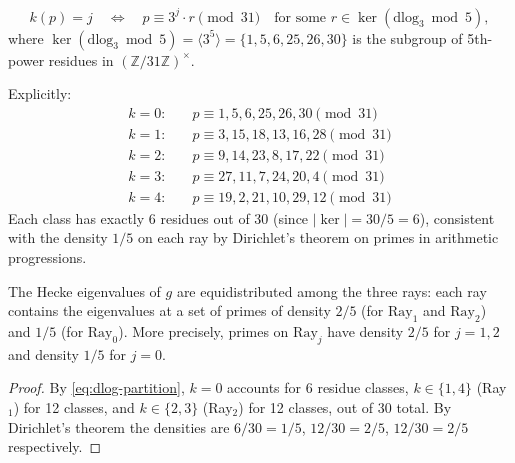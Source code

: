 \begin{equation}
\label{eq:dlog-partition}
  k(p) = j \quad\Longleftrightarrow\quad
  p \equiv 3^j \cdot r \pmod{31}
  \quad \text{for some } r \in \ker(\mathrm{dlog}_3 \bmod 5),
\end{equation}
where $\ker(\mathrm{dlog}_3 \bmod 5) = \langle 3^5 \rangle = \{1, 5, 6, 25, 26, 30\}$
is the subgroup of 5th-power residues in $(\mathbb{Z}/31\mathbb{Z})^\times$.

Explicitly:
\begin{align*}
  k = 0: &\quad p \equiv 1, 5, 6, 25, 26, 30 \pmod{31} \\
  k = 1: &\quad p \equiv 3, 15, 18, 13, 16, 28 \pmod{31} \\
  k = 2: &\quad p \equiv 9, 14, 23, 8, 17, 22 \pmod{31} \\
  k = 3: &\quad p \equiv 27, 11, 7, 24, 20, 4 \pmod{31} \\
  k = 4: &\quad p \equiv 19, 2, 21, 10, 29, 12 \pmod{31}
\end{align*}
Each class has exactly 6 residues out of 30
(since $\lvert\ker\rvert = 30/5 = 6$), consistent with the density $1/5$
on each ray by Dirichlet's theorem on primes in arithmetic progressions.

\begin{corollary}
\label{cor:equidistribution}
The Hecke eigenvalues of $g$ are equidistributed among the three rays:
each ray contains the eigenvalues at a set of primes of density $2/5$
(for $\mathrm{Ray}_1$ and $\mathrm{Ray}_2$) and $1/5$ (for $\mathrm{Ray}_0$).
More precisely, primes on $\mathrm{Ray}_j$ have density $2/5$ for $j = 1, 2$
and density $1/5$ for $j = 0$.
\end{corollary}

\begin{proof}
By \eqref{eq:dlog-partition}, $k=0$ accounts for 6 residue classes,
$k \in \{1,4\}$ (Ray$_1$) for 12 classes, and $k \in \{2,3\}$ (Ray$_2$)
for 12 classes, out of 30 total. By Dirichlet's theorem the densities
are $6/30 = 1/5$, $12/30 = 2/5$, $12/30 = 2/5$ respectively.
\end{proof}
